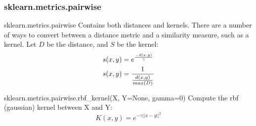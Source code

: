 \documentclass[10pt, colorlinks]{beamer}
\begin{document}
\begin{frame}[fragile]\frametitle{sklearn.metrics.pairwise}
\begin{block}{sklearn.metrics.pairwise}
Contains both distances and kernels. There are a number of ways to convert between a distance metric and a similarity measure, such as a kernel. Let $D$ be the distance, and $S$ be the kernel:
\begin{align}
    s(x,y) &= e^{-d(x,y) \over \gamma } \\
    s(x,y) &= \frac{1}{\frac{d(x,y)}{max(D)}} 
\end{align}
\end{block}
\pause
\begin{block}{sklearn.metrics.pairwise.rbf\_kernel(X, Y=None, gamma=0)}
Compute the rbf (gaussian) kernel between X and Y:
\begin{equation}
    K(x,y) = e^{-\gamma ||x-y||^2}
\end{equation}
\end{block}

\end{frame}
\end{document}
